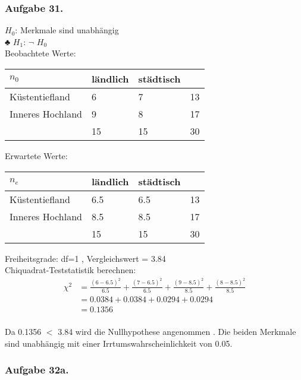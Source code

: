 \documentclass[a4paper,12pt]{article}
\newcommand{\ex}[1]{\newpage\subsubsection*{Aufgabe #1.}}
\begin{document}
	
	


\ex{31}

$H_0$: Merkmale sind unabhängig \\♣
$H_1$: $\neg$ $H_0$\\

Beobachtete Werte:\\

\begin{tabular}{ | l | l | l | p{5cm} |}
	\hline
	$n_0$ & ländlich & städtisch &   \\ \hline
	Küstentiefland & 6 & 7 & 13\\ \hline
	Inneres Hochland & 9 & 8 & 17 \\ \hline
	 & 15 & 15 & 30\\ \hline

\end{tabular}

Erwartete Werte:\\

\begin{tabular}{ | l | l | l | p{5cm} |}
	\hline
	$n_e$ & ländlich & städtisch &   \\ \hline
	Küstentiefland & 6.5 & 6.5 & 13\\ \hline
	Inneres Hochland & 8.5 & 8.5 & 17 \\ \hline
	& 15 & 15 & 30\\ \hline
	
\end{tabular}


Freiheitsgrade:  df=1 , Vergleichswert = 3.84\\
Chiquadrat-Teststatistik berechnen:\\

	\begin{align*}
\chi^2 
&= \frac{(6-6.5)^2}{6.5}+\frac{(7-6.5)^2}{6.5}+\frac{(9-8.5)^2}{8.5}+\frac{(8-8.5)^2}{8.5} \\
&= 0.0384 + 0.0384 + 0.0294 + 0.0294\\
&= 	0.1356\\
\end{align*}

Da 0.1356 $<$ 3.84 wird die Nullhypothese angenommen . Die beiden Merkmale sind unabhängig mit einer Irrtumswahrscheinlichkeit von 0.05.

	
\ex{32a}
\end{document}
